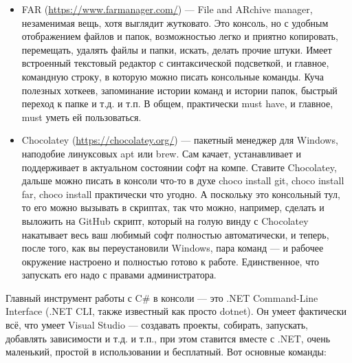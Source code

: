 \documentclass[a5paper]{article}
\begin{document}
\begin{itemize}
    \begin{itemize}
        \item FAR (\url{https://www.farmanager.com/}) --- File and ARchive manager, незаменимая вещь, хотя выглядит жутковато. Это консоль, но с удобным отображением файлов и папок, возможностью легко и приятно копировать, перемещать, удалять файлы и папки, искать, делать прочие штуки. Имеет встроенный текстовый редактор с синтаксической подсветкой, и главное, командную строку, в которую можно писать консольные команды. Куча полезных хоткеев, запоминание истории команд и истории папок, быстрый переход к папке и т.д. и т.п. В общем, практически must have, и главное, must уметь ей пользоваться.
        \item Chocolatey (\url{https://chocolatey.org/}) --- пакетный менеджер для Windows, наподобие линуксовых apt или brew. Сам качает, устанавливает и поддерживает в актуальном состоянии софт на компе. Ставите Chocolatey, дальше можно писать в консоли что-то в духе choco install git, choco install far, choco install практически что угодно. А поскольку это консольный тул, то его можно вызывать в скриптах, так что можно, например, сделать и выложить на GitHub скрипт, который на голую винду с Chocolatey накатывает весь ваш любимый софт полностью автоматически, и теперь, после того, как вы переустановили Windows, пара команд --- и рабочее окружение настроено и полностью готово к работе. Единственное, что запускать его надо с правами администратора.
    \end{itemize}
\end{itemize}

Главный инструмент работы с C\# в консоли --- это .NET Command-Line Interface (.NET CLI, также известный как просто dotnet). Он умеет фактически всё, что умеет Visual Studio --- создавать проекты, собирать, запускать, добавлять зависимости и т.д. и т.п., при этом ставится вместе с .NET, очень маленький, простой в использовании и бесплатный. Вот основные команды:
\end{document}
